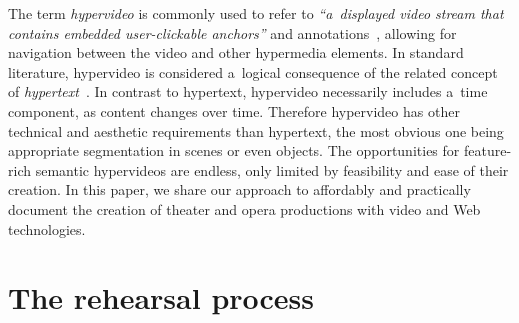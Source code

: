\documentclass[conference]{IEEEtran}
\newcommand{\todo}[1]{\noindent\textcolor{red}{{\bf \{ToDo} #1{\bf \}}}}
\begin{document}
The term \emph{hypervideo} is commonly used to refer to
\textit{``a~displayed video stream that contains embedded user-clickable anchors''}
and annotations~\cite{sawhney1996hypercafe}, %
allowing for navigation between the video and other hypermedia elements.
In standard literature, hypervideo is considered a~logical consequence
of the related concept of \emph{hypertext}~\cite{economist2006hypervideo}. %
In contrast to hypertext, hypervideo necessarily includes a~time component,
as content changes over time.
Therefore hypervideo has other technical and aesthetic requirements
than hypertext, the most obvious one being appropriate segmentation in scenes
or even objects.
The opportunities for feature-rich semantic hypervideos are endless,
only limited by feasibility and ease of their creation.
In this paper, we share our approach to affordably and practically document
the creation of theater and opera productions with video and Web technologies.


\section{The rehearsal process}
\label{sec:context}
%
\end{document}
